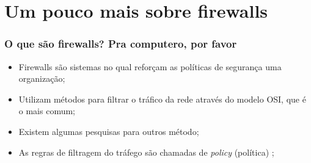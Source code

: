 \section{Um pouco mais sobre firewalls}

\begin{frame}
	\frametitle{O que são firewalls? Pra computero, por favor}

	\begin{itemize}
		\item Firewalls são sistemas no qual reforçam as políticas de segurança uma organização;
		\item Utilizam métodos para filtrar o tráfico da rede através do modelo OSI, que é o mais comum;
		\item Existem algumas pesquisas para outros método;
		\item As regras de filtragem do tráfego são chamadas de \textit{policy} (política) \cite{history};

	\end{itemize}
\end{frame}
